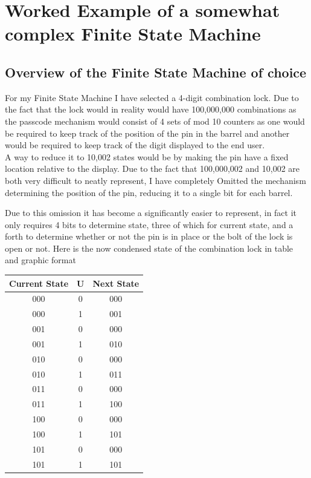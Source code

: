 \documentclass{article}
\begin{document}
\section {Worked Example of a somewhat complex Finite State Machine}
\subsection{Overview of the Finite State Machine of choice}
For my Finite State Machine I have selected a 4-digit combination lock. Due to the fact that the lock would in reality would have 100,000,000 combinations as the passcode mechanism would consist of 4 sets of mod 10 counters as one would be required to keep track of the position of the pin in the barrel and another would be required to keep track of the digit displayed to the end user.\\
A way to reduce it to 10,002 states would be by making the pin have a fixed location relative to the display. Due to the fact that 100,000,002 and 10,002 are both very difficult to neatly represent, I have completely Omitted the mechanism determining the position of the pin, reducing it to a single bit for each barrel.
\par\null\par
Due to this omission it has become a significantly easier to represent, in fact it only requires 4 bits to determine state, three of which for current state, and a forth to determine whether or not the pin is in place or the bolt of the lock is open or not. Here is the now condensed state of the combination lock in table and graphic format
\par\null\par
\begin{minipage}[t]{0.48\linewidth}
	\vspace{0pt}
	\begin{tabular}{c|c||c}
		Current State & U & Next State\\
		\hline
		000 & 0 & 000 \\
		000 & 1 & 001 \\
		001 & 0 & 000 \\
		001 & 1 & 010 \\
		010 & 0 & 000 \\
		010 & 1 & 011 \\
		011 & 0 & 000 \\
		011 & 1 & 100 \\
		100 & 0 & 000 \\
		100 & 1 & 101 \\
		101 & 0 & 000 \\
		101 & 1 & 101 \\  
	\end{tabular}
\end{minipage}
\end{document}
